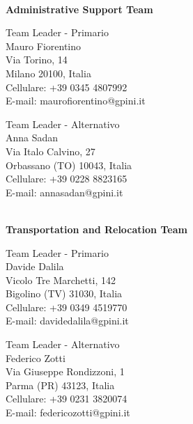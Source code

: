 \documentclass[12pt, a4paper, titlepage]{report}
\begin{document}
	\vspace{0.5cm}
	\centerline{\textbf{\\Administrative Support Team}}
	\begin{paracol}{2}
		\setlength{\columnsep}{5em}
		\begin{leftcolumn}
			\begin{adjustwidth}{0.5cm}{}
				Team Leader - Primario \\
				Mauro Fiorentino \\
				Via Torino, 14\\ 
				Milano 20100, Italia  
				\\Cellulare:  +39 0345 4807992 \\
				E-mail:  maurofiorentino@gpini.it 
			\end{adjustwidth}
		\end{leftcolumn}
		\begin{rightcolumn}
			\begin{adjustwidth}{0.5cm}{}
				Team Leader - Alternativo \\
				Anna Sadan\\
				Via Italo Calvino, 27\\ 
				Orbassano (TO) 10043, Italia \\
				Cellulare:  +39 0228 8823165 \\
				E-mail: annasadan@gpini.it 
			\end{adjustwidth}
		\end{rightcolumn}
	\end{paracol}
	
	\vspace{0.5cm}
	\centerline{\textbf{\\Transportation and Relocation Team}}
	\begin{paracol}{2}
		\setlength{\columnsep}{5em}
		\begin{leftcolumn}
			\begin{adjustwidth}{0.5cm}{}
				Team Leader - Primario \\
				Davide Dalila \\
				Vicolo Tre Marchetti, 142\\ 
				Bigolino (TV) 31030, Italia \\
				Cellulare:  +39 0349 4519770 \\
				E-mail:  davidedalila@gpini.it 
			\end{adjustwidth}
		\end{leftcolumn}
		\begin{rightcolumn}
			\begin{adjustwidth}{0.5cm}{}
				Team Leader - Alternativo \\
				Federico Zotti\\
				Via Giuseppe Rondizzoni, 1\\ 
				Parma (PR) 43123, Italia \\
				Cellulare:  +39 0231 3820074 \\
				E-mail: federicozotti@gpini.it 
			\end{adjustwidth}
		\end{rightcolumn}
	\end{paracol}
	
\end{document}
